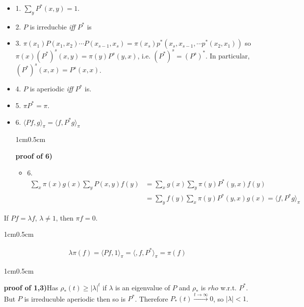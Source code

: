\documentclass[12pt,a4paper]{article}
\newenvironment{proof}
{\begin{changemargin}{1cm}{0.5cm} 
	}%
	{\end{changemargin}
}
\newenvironment{p}
{\begin{proof} 
	}%
	{\end{proof}
}
\renewenvironment{i}
{\begin{itemize} 
	}%
	{\end{itemize}
}
\begin{document}
\lem \begin{i}
\item[1.] $\sum_y P^*(x,y)=1$.
\item[2.] $P$ is irreducbie \emph{iff} $P^*$ is
\item[3.] $\pi(x_1)P(x_1, x_2) \cdots P(x_{s-1},x_s)= \pi(x_s) p^*(x_s,x_{s-1}, \cdots p^*(x_2,x_1))$ so $\pi(x) (P^*)^s(x,y) = \pi(y) P^s(y,x)$, i.e. $(P^*)^s = (P^s)^*$. In particular, $(P^*)^s (x,x) = P^s (x,x)$.
\item[4.] $P$ is aperiodic \emph{iff} $P^*$ is.
\item[5.] $\pi P^* =\pi$.
\item[6.] $\langle Pf, g\rangle_{\pi} = \langle f, P^* g\rangle_{\pi}$
\begin{proof}
\textbf{proof of 6)} \begin{i}
\item[6.]
\begin{align*}
\sum_x \pi(x) g(x) \sum_y P(x,y) f(y) &= \sum_x g(x) \sum_y \pi(y) P^*(y,x) f(y) \\
&= \sum_{y} f(y) \sum_x \pi(y) P^*(y,x)g(x) = \langle f,P^* g\rangle_{\pi}
\end{align*}
\end{i}
\end{proof}
\end{i}
\s

\lem If $Pf =\lambda f$, $\lambda \neq 1$, then $\pi f=0$.
\begin{p}
\pf \begin{align*}
\lambda \pi(f) = \langle Pf, 1\rangle_{\pi} = \langle, f, P^*\rangle_{\pi} = \pi(f)
\end{align*}
\eop
\end{p}
\s

\begin{proof}
\textbf{proof of 1,3)}Has $\rho_*(t) \geq |\lambda|^t$ if $\lambda$ is an eigenvalue of $P$ and $\rho_*$ is $rho$ w.r.t. $P^*$. But $P$ is irreducuble aperiodic then so is $P^*$. Therefore $P_*(t) \xrightarrow{t\rightarrow \infty} 0$, so $|\lambda|<1$.

\eop
\end{proof}
\s
\end{document}
